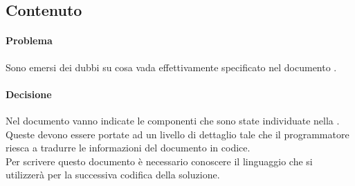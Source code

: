\subsection{Contenuto \DP}
\paragraph{Problema}
Sono emersi dei dubbi su cosa vada effettivamente specificato nel documento \DP.
\paragraph{Decisione}
Nel documento \DP vanno indicate le componenti che sono state individuate nella \ST. \\ Queste devono essere portate ad un livello di dettaglio tale che il programmatore riesca a tradurre le informazioni del documento in codice.\\ Per scrivere questo documento è necessario conoscere il linguaggio che si utilizzerà per la successiva codifica della soluzione.
